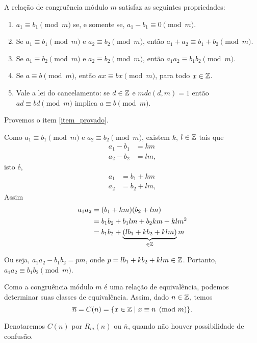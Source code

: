 \begin{teorema}
	A rela{\c c}{\~a}o de congru{\^e}ncia m{\'o}dulo $m$ satisfaz as seguintes propriedades:
	\begin{enumerate}[label={\roman*})]
		\item $a_{1}\equiv b_{1}\pmod{m}$ se, e somente se, $a_{1}-b_{1}\equiv 0\pmod{m}$.
		\item Se $a_{1}\equiv b_{1}\pmod{m}$ e $a_{2}\equiv b_{2}\pmod{m}$, ent{\~a}o $a_{1}+a_{2}\equiv b_{1}+b_{2}\pmod{m}$.
		\item Se $a_{1}\equiv b_{2}\pmod{m}$ e $a_{2}\equiv b_{2}\pmod{m}$, ent{\~a}o $a_{1}a_{2}\equiv b_{1}b_{2}\pmod{m}$.\label{item_provado}
		\item Se $a\equiv b\pmod{m}$, ent{\~a}o $ax\equiv bx\pmod{m}$, para todo $x \in \mathbb{Z}$.
		\item Vale a lei do cancelamento: se $d \in \mathbb{Z}$ e $mdc(d,m) = 1$ ent{\~a}o $ad \equiv bd \pmod{m}$ implica $a\equiv b \pmod{m}$.
	\end{enumerate}
\end{teorema}
\begin{prova}
	Provemos o item \ref{item_provado}.
	
	Como $a_{1}\equiv b_{1}\pmod{m}$ e $a_{2}\equiv b_{2}\pmod{m}$, existem $k$, $l \in \mathbb{Z}$ tais que
	\begin{align*}
		a_1 - b_1 &= km\\
		a_2 - b_2 &= lm,
	\end{align*}
	isto \'e,
	\begin{align*}
		a_1 &= b_1 + km\\
		a_2 &= b_2 + lm,
	\end{align*}
	Assim
	\begin{align*}
		a_1a_2 &= (b_1 + km)(b_2 + lm) \\ &= b_1b_2 + b_1lm + b_2km + klm^2 \\ &= b_1b_2 + \underbrace{(lb_{1}+kb_{2}+klm)}_{\in \mathbb{Z}}m
	\end{align*}
	
	Ou seja, $a_1a_2 - b_1b_2 = pm$, onde $p = lb_1 + kb_2 + klm \in \mathbb{Z}$. Portanto, $a_1a_2 \equiv b_1b_2 \pmod{m}$.
\end{prova}

Como a congru{\^e}ncia m{\'o}dulo $m$ {\'e} uma rela{\c c}{\~a}o de equival{\^e}ncia, podemos determinar suas classes de equival{\^e}ncia. Assim, dado $n \in \mathbb{Z}$, temos
\[
	\overline{n} = C(n) = \{x \in \mathbb{Z} \mid x\equiv n \pmod{m}\}.
\]

Denotaremos $C(n)$ por $R_{m}(n)$ ou $\overline{n}$, quando n{\~a}o houver possibilidade de confus{\~a}o.

